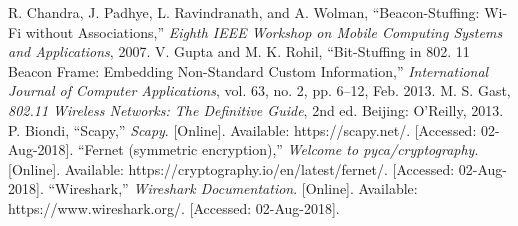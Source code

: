 \documentclass[letterpaper, 10 pt, conference]{ieeeconf}  %
\begin{document}
\begin{thebibliography}{99}

 R. Chandra, J. Padhye, L. Ravindranath, and A. Wolman, “Beacon-Stuffing: Wi-Fi without Associations,” \textit{Eighth IEEE Workshop on Mobile Computing Systems and Applications}, 2007.
 V. Gupta and M. K. Rohil, “Bit-Stuffing in 802. 11 Beacon Frame: Embedding Non-Standard Custom Information,” \textit{International Journal of Computer Applications}, vol. 63, no. 2, pp. 6–12, Feb. 2013.
 M. S. Gast, \textit{802.11 Wireless Networks: The Definitive Guide}, 2nd ed. Beijing: O'Reilly, 2013.
 P. Biondi, “Scapy,” \textit{Scapy}. [Online]. Available: https://scapy.net/. [Accessed: 02-Aug-2018].
 “Fernet (symmetric encryption),” \textit{Welcome to pyca/cryptography}. [Online]. Available: https://cryptography.io/en/latest/fernet/. [Accessed: 02-Aug-2018].
 “Wireshark,” \textit{Wireshark Documentation}. [Online]. Available: https://www.wireshark.org/. [Accessed: 02-Aug-2018].

\end{thebibliography}
\end{document}
